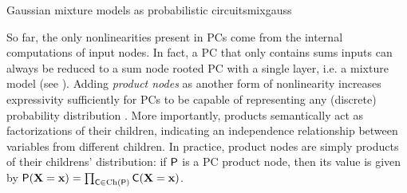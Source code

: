 \begin{example}[sidebyside,lefthand width=0.55\textwidth]{Gaussian mixture models as probabilistic circuits}{mixgauss}
\begin{center}
  \end{center}
\end{example}

So far, the only nonlinearities present in PCs come from the internal computations of input nodes.
In fact, a PC that only contains sums inputs can always be reduced to a sum node rooted PC with a
single layer, i.e. a mixture model (see ). Adding \emph{product nodes} as another
form of nonlinearity increases expressivity sufficiently for PCs to be capable of representing any
(discrete) probability distribution \citep{darwiche03,martens14,peharz15}. More importantly,
products semantically act as factorizations of their children, indicating an independence
relationship between variables from different children. In practice, product nodes are simply
products of their childrens' distribution: if $\operatorname{\textsf{P}}$ is a PC product node, then its value is given
by $\operatorname{\textsf{P}}(\mathbf{X}=\mathbf{x})=\prod_{\operatorname{\textsf{C}}\in\operatorname*{\normalfont{Ch}}(\operatorname{\textsf{P}})}\operatorname{\textsf{C}}(\mathbf{X}=\mathbf{x})$.

